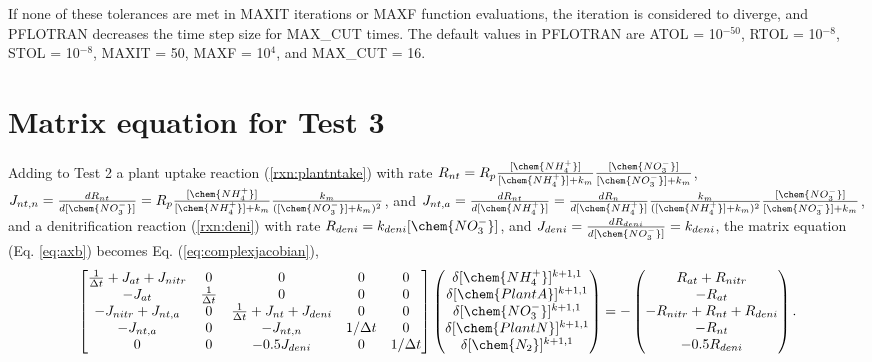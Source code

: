 \documentclass[gmd, manuscript]{copernicus}
\begin{document}
If none of these tolerances are met in MAXIT iterations or MAXF function
evaluations, the iteration is considered to diverge, and PFLOTRAN decreases the
time step size for MAX\_CUT times. The default values in PFLOTRAN are ATOL =
10$^{-50}$, RTOL = 10$^{-8}$, STOL = 10$^{-8}$,  %
MAXIT = 50, MAXF = 10$^4$, and MAX\_CUT = 16.

\section{Matrix equation for Test 3}
\label{sec:eqtest3}
Adding to Test 2 a plant  uptake reaction (\ref{rxn:plantntake}) with rate
$R_{nt}=R_p\frac{[\chem{NH_4^+}]}{[\chem{NH_4^+}] +
k_m}\frac{[\chem{NO_3^-}]}{[\chem{NO_3^-}] + k_m}$, $J_{nt,n}
=\frac{dR_{nt}}{d[\chem{NO_3^-}]}=R_p\frac{[\chem{NH_4^+}]}{[\chem{NH_4^+}] +
k_m}\frac{k_m}{([\chem{NO_3^-}] + k_m)^2}$, and $J_{nt,a} =
\frac{dR_{nt}}{d[\chem{NH_4^+}]}=\frac{dR_n}{d[\chem{NH_4^+}]}
\frac{k_m}{([\chem{NH_4^+}] + k_m)^2}\frac{[\chem{NO_3^-}]}{[\chem{NO_3^-}] +
k_m}$, and a denitrification reaction
(\ref{rxn:deni}) with rate $R_{deni}=k_{deni} [\chem{NO_3^-}]$, and $J_{deni} =
\frac{dR_{deni}}{d[\chem{NO_3^-}]}=k_{deni}$, the matrix equation (Eq. \ref{eq:axb}) becomes  
Eq. (\ref{eq:complexjacobian}),
\begin{equation}
\label{eq:complexjacobian}
\left[
\begin{matrix}
\frac{1}{\Delta t} + J_{at} + J_{nitr} & 0                  & 0                                   &0 & 0\\
-J_{at}                              & \frac{1}{\Delta t} & 0 &0 &0\\
-J_{nitr} + J_{nt,a}                 & 0                  & \frac{1}{\Delta t} + J_{nt} + J_{deni}&0 &0 \\
-J_{nt,a}                            & 0                  & -J_{nt,n}                             &1/\Delta t & 0 \\
 0                                   & 0                  & -0.5J_{deni}                             & 0 &1/\Delta t
\end{matrix}
\right]
\left(
\begin{matrix}
\delta [\chem{NH_4^+}]^{k+1,1} \\
\delta [\chem{PlantA}]^{k+1,1} \\
\delta [\chem{NO_3^-}]^{k+1,1} \\ 
\delta [\chem{PlantN}]^{k+1,1} \\
\delta [\chem{N_2}]^{k+1,1} 
\end{matrix}
\right)
=-
\left(
\begin{matrix}
R_{at} + R_{nitr} \\
-R_{at} \\
-R_{nitr} + R_{nt} + R_{deni} \\
-R_{nt} \\
-0.5R_{deni}
\end{matrix}
\right).
\end{equation}


\end{document}

